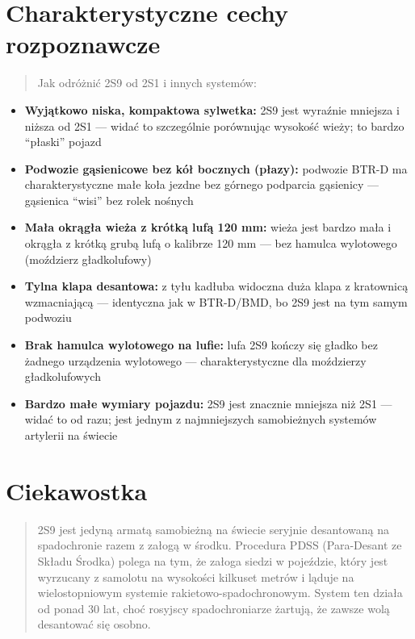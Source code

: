 \documentclass[12pt,openany,oneside]{book}
\providecommand{\tightlist}{%
  \setlength{\itemsep}{0pt}\setlength{\parskip}{0pt}}
\begin{document}
\section{Charakterystyczne cechy
rozpoznawcze}\label{charakterystyczne-cechy-rozpoznawcze-12}

\begin{quote}
Jak odróżnić 2S9 od 2S1 i innych systemów:
\end{quote}

\begin{itemize}
\tightlist
\item
  \textbf{Wyjątkowo niska, kompaktowa sylwetka:} 2S9 jest wyraźnie
  mniejsza i niższa od 2S1 --- widać to szczególnie porównując wysokość
  wieży; to bardzo ``płaski'' pojazd
\item
  \textbf{Podwozie gąsienicowe bez kół bocznych (płazy):} podwozie BTR-D
  ma charakterystyczne małe koła jezdne bez górnego podparcia gąsienicy
  --- gąsienica ``wisi'' bez rolek nośnych
\item
  \textbf{Mała okrągła wieża z krótką lufą 120 mm:} wieża jest bardzo
  mała i okrągła z krótką grubą lufą o kalibrze 120 mm --- bez hamulca
  wylotowego (moździerz gładkolufowy)
\item
  \textbf{Tylna klapa desantowa:} z tyłu kadłuba widoczna duża klapa z
  kratownicą wzmacniającą --- identyczna jak w BTR-D/BMD, bo 2S9 jest na
  tym samym podwoziu
\item
  \textbf{Brak hamulca wylotowego na lufie:} lufa 2S9 kończy się gładko
  bez żadnego urządzenia wylotowego --- charakterystyczne dla moździerzy
  gładkolufowych
\item
  \textbf{Bardzo małe wymiary pojazdu:} 2S9 jest znacznie mniejsza niż
  2S1 --- widać to od razu; jest jednym z najmniejszych samobieżnych
  systemów artylerii na świecie
\end{itemize}

\section{Ciekawostka}\label{ciekawostka-12}

\begin{quote}
2S9 jest jedyną armatą samobieżną na świecie seryjnie desantowaną na
spadochronie razem z załogą w środku. Procedura PDSS (Para-Desant ze
Składu Środka) polega na tym, że załoga siedzi w pojeździe, który jest
wyrzucany z samolotu na wysokości kilkuset metrów i ląduje na
wielostopniowym systemie rakietowo-spadochronowym. System ten działa od
ponad 30 lat, choć rosyjscy spadochroniarze żartują, że zawsze wolą
desantować się osobno.
\end{quote}
\end{document}
